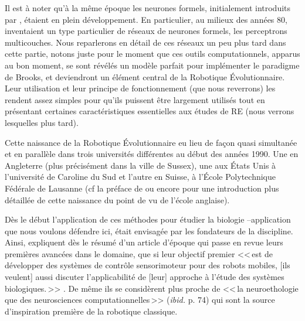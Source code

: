 Il est à noter qu'à la même époque les neurones formels, initialement introduits par \cite{mcculloch1943alogicalcideaimmanervacti}, étaient en plein développement. En particulier, au milieux des années 80, \cite{rumelhart1986learninginternalrepresentationsbyerrorpropagation} inventaient un type particulier de réseaux de neurones formels, les perceptrons multicouches. Nous reparlerons en détail de ces réseaux un peu plus tard dans cette partie, notons juste pour le moment que ces outils computationnels, apparus au bon moment, se sont révélés un modèle parfait pour implémenter le paradigme de Brooks, et deviendront un élément central de la Robotique \'Evolutionnaire. Leur utilisation et leur principe de fonctionnement (que nous reverrons) les rendent assez simples pour qu'ils puissent être largement utilisés tout en présentant certaines caractéristiques essentielles aux études de RE (nous verrons lesquelles plus tard).

Cette naissance de la Robotique \'Evolutionnaire eu lieu de fa\c{c}on quasi simultanée et en parallèle dans trois universités différentes au début des années 1990. Une en Angleterre (plus précisément dans la ville de Sussex), une aux \'Etats Unis à l'université de Caroline du Sud et l'autre en Suisse, à l'\'Ecole Polytechnique Fédérale de Lausanne (cf la préface de \cite{nolfi00evolrobobiolintetechselfmach} ou encore \citet{harvey97evolutionaryroboticssussexapproach} pour une introduction plus détaillée de cette naissance du point de vu de l'école anglaise). 

Dès le début l'application de ces méthodes pour étudier la biologie --application que nous voulons défendre ici, était envisagée par les fondateurs de la discipline. Ainsi, \cite{cliff93explorationsinevolutionaryrobotics} expliquent dès le résumé d'un article d'époque qui passe en revue leurs premières avancées dans le domaine, que si leur objectif premier <<\,est de développer des systèmes de contrôle sensorimoteur pour des robots mobiles, [ils veulent] aussi discuter l'applicabilité de [leur] approche à l'étude des systèmes biologiques.\,>> \citep[p. 73]{cliff93explorationsinevolutionaryrobotics}. De même ils se considèrent plus proche de <<\,la neuroethologie que des neurosciences computationnelles\,>> (\emph{ibid.} p. 74) qui sont la source d'inspiration première de la robotique classique. 

